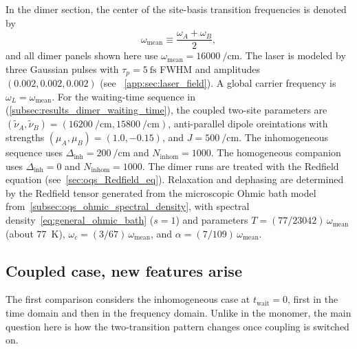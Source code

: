 In the dimer section, the center of the site-basis transition frequencies is denoted by
\begin{equation*}
\omega_{\mathrm{mean}}\equiv\frac{\omega_A+\omega_B}{2},
\end{equation*}
and all dimer panels shown here use $\omega_{\mathrm{mean}}=\SI{16000}{\per\centi\metre}$. The laser is modeled by three Gaussian pulses with 
$\tau_p = \SI{5}{\femto\second}$ FWHM and amplitudes $(0.002,0.002,0.002)$ (see ~\autoref{app:sec:laser_field}). A global carrier frequency is  $\omega_L=\omega_{\mathrm{mean}}$. For the waiting-time sequence in (\autoref{subsec:results_dimer_waiting_time}), the coupled two-site parameters are $(\tilde{\nu}_A,\tilde{\nu}_B)=(\SI{16200}{\per\centi\metre},\SI{15800}{\per\centi\metre})$, anti-parallel dipole oreintations with strengths $(\mu_A,\mu_B)=(1.0,-0.15)$, and $J=\SI{500}{\per\centi\metre}$. The inhomogeneous sequence uses $\Delta_{\mathrm{inh}}=\SI{200}{\per\centi\metre}$ and $N_{\mathrm{inhom}}=1000$. The homogeneous companion uses $\Delta_{\mathrm{inh}}=0$ and $N_{\mathrm{inhom}}=1000$.
The dimer runs are treated with the Redfield equation (see~\autoref{sec:oqs_Redfield_eq}). Relaxation and dephasing are determined by the Redfield tensor generated from the microscopic Ohmic bath model from~\autoref{subsec:oqs_ohmic_spectral_density}, with spectral density~\autoref{eq:general_ohmic_bath} ($s=1$) and parameters $T=(77/23042)\,\omega_{\mathrm{mean}}$ (about \SI{77}{\kelvin}), $\omega_c=(3/67)\,\omega_{\mathrm{mean}}$, and $\alpha=(7/109)\,\omega_{\mathrm{mean}}$.
\subsection{Coupled case, new features arise}
\label{subsec:results_dimer_coupled_case}
The first comparison considers the inhomogeneous case at $t_{\mathrm{wait}}=0$, first in the time domain and then in the frequency domain. Unlike in the monomer, the main question here is how the two-transition pattern changes once coupling is switched on.

